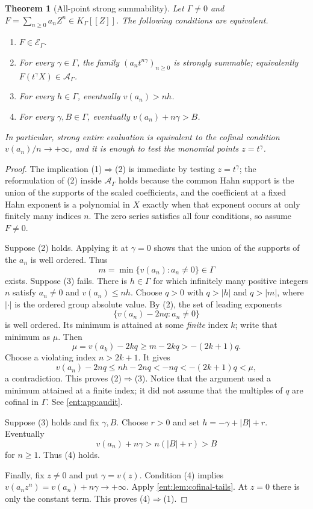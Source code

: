 \documentclass[11pt]{article}
\newtheorem{theorem}{Theorem}[section]
\theoremstyle{plain}
\theoremstyle{plain}
\theoremstyle{plain}
\theoremstyle{definition}
\theoremstyle{definition}
\theoremstyle{definition}
\theoremstyle{definition}
\theoremstyle{remark}
\newcommand{\K}{K_\Gamma}\newcommand{\KD}{K_\Delta}
\newcommand{\E}{\mathcal E_\Gamma}
\newcommand{\A}{\mathcal A_\Gamma}\newcommand{\OO}{\mathcal O_\Gamma}
\begin{document}
\begin{theorem}[All-point strong summability]\label{ent:thm:criterion}
Let $\Gamma\ne0$ and $F=\sum_{n\ge0}a_nZ^n\in\K[[Z]]$. The following
conditions are equivalent.
\begin{enumerate}[label=\textnormal{(\arabic*)},leftmargin=2em]
\item $F\in\E$.
\item For every $\gamma\in\Gamma$, the family $(a_nt^{n\gamma})_{n\ge0}$ is
strongly summable; equivalently $F(t^\gamma X)\in\A$.
\item For every $h\in\Gamma$, eventually $v(a_n)>nh$.
\item For every $\gamma,B\in\Gamma$, eventually $v(a_n)+n\gamma>B$.
\end{enumerate}
In particular, strong entire evaluation is equivalent to the cofinal
condition $v(a_n)/n\to+\infty$, and it is enough to test the monomial points
$z=t^\gamma$.
\end{theorem}
\begin{proof}
The implication (1)$\Rightarrow$(2) is immediate by testing $z=t^\gamma$; the
reformulation of (2) inside $\A$ holds because the common Hahn support is the
union of the supports of the scaled coefficients, and the coefficient at a
fixed Hahn exponent is a polynomial in $X$ exactly when that exponent occurs
at only finitely many indices $n$. The zero series satisfies all four
conditions, so assume $F\ne0$.

Suppose (2) holds. Applying it at $\gamma=0$ shows that the union of the
supports of the $a_n$ is well ordered. Thus
\[
 m=\min\{v(a_n):a_n\ne0\}\in\Gamma
\]
exists. Suppose (3) fails. There is $h\in\Gamma$ for which infinitely many
positive integers $n$ satisfy $a_n\ne0$ and $v(a_n)\le nh$. Choose $q>0$ with
$q>|h|$ and $q>|m|$, where $|\cdot|$ is the ordered group absolute value.
By (2), the set of leading exponents
\[
 \{v(a_n)-2nq:a_n\ne0\}
\]
is well ordered. Its minimum is attained at some \emph{finite} index $k$;
write that minimum as $\mu$. Then
\[
 \mu=v(a_k)-2kq\ge m-2kq>-(2k+1)q.
\]
Choose a violating index $n>2k+1$. It gives
\[
 v(a_n)-2nq\le nh-2nq<-nq<-(2k+1)q<\mu,
\]
a contradiction. This proves (2)$\Rightarrow$(3). Notice that the argument
used a minimum attained at a finite index; it did not assume that the
multiples of $q$ are cofinal in $\Gamma$. See \cref{ent:app:audit}.

Suppose (3) holds and fix $\gamma,B$. Choose $r>0$ and set
$h=-\gamma+|B|+r$. Eventually
\[
 v(a_n)+n\gamma>n(|B|+r)>B
\]
for $n\ge1$. Thus (4) holds.

Finally, fix $z\ne0$ and put $\gamma=v(z)$. Condition (4) implies
$v(a_nz^n)=v(a_n)+n\gamma\to+\infty$. Apply
\cref{ent:lem:cofinal-tails}. At $z=0$ there is only the constant term.
This proves (4)$\Rightarrow$(1).
\end{proof}
\end{document}
